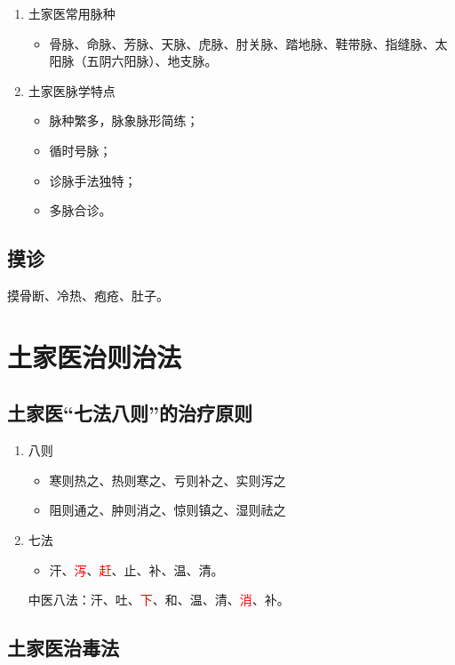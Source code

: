 \documentclass[cn,blue,12pt,normal,founder]{elegantnote}
\newcommand{\redt}[1]{\textcolor{red}{{}#1}}      %
\begin{document}
\begin{enumerate}
  \item 土家医常用脉种
  \begin{itemize}
    \item 骨脉、命脉、芳脉、天脉、虎脉、肘关脉、踏地脉、鞋带脉、指缝脉、太阳脉（五阴六阳脉）、地支脉。
  \end{itemize}
  \item 土家医脉学特点
  \begin{itemize}
    \item 脉种繁多，脉象脉形简练；
    \item 循时号脉；
    \item 诊脉手法独特；
    \item 多脉合诊。
  \end{itemize}
\end{enumerate}

\subsection{摸诊}

摸骨断、冷热、疱疮、肚子。

\section{土家医治则治法}

\subsection{土家医“七法八则”的治疗原则}

\begin{enumerate}
  \item 八则
  \begin{itemize}
    \item 寒则热之、热则寒之、亏则补之、实则泻之
    \item 阻则通之、肿则消之、惊则镇之、湿则祛之
  \end{itemize}
  \item 七法
  \begin{itemize}
    \item 汗、\redt{泻}、\redt{赶}、止、补、温、清。
  \end{itemize}
  \begin{note}
  中医八法：汗、吐、\redt{下}、和、温、清、\redt{消}、补。
  \end{note}
\end{enumerate}

\subsection{土家医治毒法}
\end{document}
